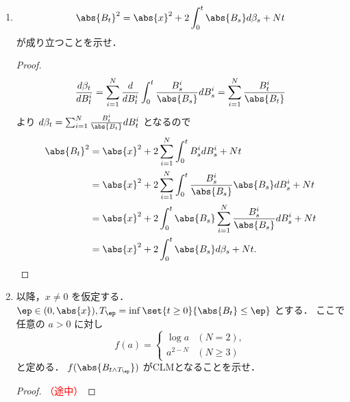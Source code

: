 \documentclass{jsarticle}
\begin{document}
\begin{enumerate}
\begin{proof}
        したがって $\beta$ は $(\clf_t)$-CLMである\nazo．
        ここで
        \begin{align}
            \gen{\beta, \beta}_t
            &= \gen{\sum_{i=1}^{N}\int_{0}^{\cdot}\frac{B_{s}^{i}}{\abs{B_s}}dB_s^i, \sum_{i=1}^{N}\int_{0}^{\cdot}\frac{B_{s}^{i}}{\abs{B_s}}dB_s^i}_t \\
            &= \sum_{i=1}^{N}\gen{\int_{0}^{\cdot}\frac{B_{s}^{i}}{\abs{B_s}}dB_s^i, \int_{0}^{\cdot}\frac{B_{s}^{i}}{\abs{B_s}}dB_s^i}_t \\
            &= \int_{0}^{t}\frac{\sum_{i=1}^{N}(B_{s}^{i})^2}{\abs{B_s}^2}ds
            = \int_{0}^{t}\frac{\abs{B_s}^2}{\abs{B_s}^2}ds = t
        \end{align}
        が成り立つことより，$\beta$ は0スタートの $(\clf_t)$-BMである．
    \end{proof}
    
    \item
    $$
    \abs{B_t}^2
    = \abs{x}^2+2\int_0^t \abs{B_s}d\beta_s+Nt
    $$
    が成り立つことを示せ．
    \begin{proof}
        \begin{align}
            \frac{d\beta_t}{dB_t^i}
            = \sum_{i=1}^{N}\frac{d}{dB_t^i}\int_0^t\frac{B_{s}^{i}}{\abs{B_s}}dB_s^i
            = \sum_{i=1}^{N}\frac{B_{t}^{i}}{\abs{B_t}}
        \end{align}
        より $d\beta_t=\sum_{i=1}^{N}\frac{B_{t}^{i}}{\abs{B_t}}dB_t^i$ となるので
        \begin{align}
            \abs{B_t}^2
            &= \abs{x}^2
            + 2\sum_{i=1}^{N}\int_{0}^{t}B_s^i dB_s^i
            + Nt \\
            &= \abs{x}^2
            + 2\sum_{i=1}^{N}\int_{0}^{t}\frac{B_{s}^{i}}{\abs{B_s}}\abs{B_s}dB_s^i
            + Nt \\
            &= \abs{x}^2
            + 2\int_{0}^{t}\abs{B_s}\sum_{i=1}^{N}\frac{B_{s}^{i}}{\abs{B_s}}dB_s^i
            + Nt \\
            &= \abs{x}^2
            + 2\int_{0}^{t}\abs{B_s}d\beta_s
            + Nt.
        \end{align}
    \end{proof}
    
    \item
    以降，$x\neq0$ を仮定する．
    $\ep\in(0,\abs{x}),T_{\ep}=\inf\set{t\ge0}{\abs{B_t}\le\ep}$ とする．
    ここで任意の $a>0$ に対し
    $$
    f(a)=
    \begin{cases}
        \log a & (N=2), \\
        a^{2-N} & (N\ge3)
    \end{cases}
    $$
    と定める．
    $f(\abs{B_{t\wedge T_{\ep}}})$ がCLMとなることを示せ．
    \begin{proof}\textcolor{red}{（途中）}
        

\end{proof}
\end{enumerate}
\end{document}
